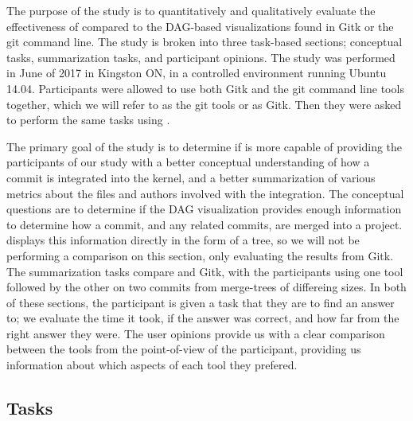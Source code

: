 The purpose of the study is to quantitatively and qualitatively evaluate
the effectiveness of \tool compared to the DAG-based visualizations
found in Gitk or the git command line. The study is broken into three
task-based sections; conceptual tasks, summarization tasks, and
participant opinions. The study was performed in June of 2017 in
Kingston ON, in a controlled environment running Ubuntu 14.04.
Participants were allowed to use both Gitk and the git command line
tools together, which we will refer to as the git tools or as Gitk. Then
they were asked to perform the same tasks using \tool.


The primary goal of the study is to determine if \tool is more capable
of providing the participants of our study with a better conceptual
understanding of how a commit is integrated into the kernel, and a
better summarization of various metrics about the files and authors
involved with the integration. The conceptual questions are to determine
if the DAG visualization provides enough information to determine how a
commit, and any related commits, are merged into a project. \tool
displays this information directly in the form of a tree, so we will not
be performing a comparison on this section, only evaluating the results
from Gitk. The summarization tasks compare \tool and Gitk, with the
participants using one tool followed by the other on two commits from
merge-trees of differeing sizes. In both of these sections, the
participant is given a task that they are to find an answer to; we
evaluate the time it took, if the answer was correct, and how far from
the right answer they were. The user opinions provide us with a clear
comparison between the tools from the point-of-view of the participant,
providing us information about which aspects of each tool they prefered.

\subsection{Tasks}
\label{sub:tasks}


